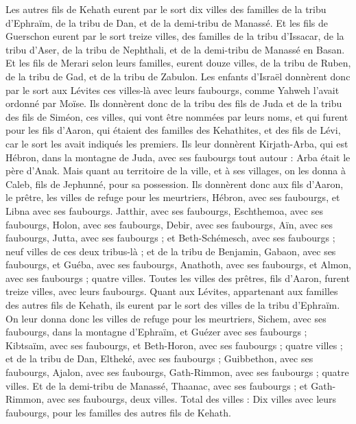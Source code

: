 \begin{multicols}{2}
Les autres fils de Kehath eurent par le sort dix villes des familles de la tribu d'Ephraïm, de la tribu de Dan, et de la demi-tribu de Manassé.
Et les fils de Guerschon eurent par le sort treize villes, des familles de la tribu d'Issacar, de la tribu d'Aser, de la tribu de Nephthali, et de la demi-tribu de Manassé en Basan.
Et les fils de Merari selon leurs familles, eurent douze villes, de la tribu de Ruben, de la tribu de Gad, et de la tribu de Zabulon.
Les enfants d'Israël donnèrent donc par le sort aux Lévites ces villes-là avec leurs faubourgs, comme Yahweh l'avait ordonné par Moïse.
Ils donnèrent donc de la tribu des fils de Juda et de la tribu des fils de Siméon, ces villes, qui vont être nommées par leurs noms,
et qui furent pour les fils d'Aaron, qui étaient des familles des Kehathites, et des fils de Lévi, car le sort les avait indiqués les premiers.
Ils leur donnèrent Kirjath-Arba, qui est Hébron, dans la montagne de Juda, avec ses faubourgs tout autour : Arba était le père d'Anak.
Mais quant au territoire de la ville, et à ses villages, on les donna à Caleb, fils de Jephunné, pour sa possession.
Ils donnèrent donc aux fils d'Aaron, le prêtre, les villes de refuge pour les meurtriers, Hébron, avec ses faubourgs, et Libna avec ses faubourgs.
Jatthir, avec ses faubourgs, Eschthemoa, avec ses faubourgs,
Holon, avec ses faubourgs, Debir, avec ses faubourgs,
Aïn, avec ses faubourgs, Jutta, avec ses faubourgs ; et Beth-Schémesch, avec ses faubourgs ; neuf villes de ces deux tribus-là ;
et de la tribu de Benjamin, Gabaon, avec ses faubourgs, et Guéba, avec ses faubourgs,
Anathoth, avec ses faubourgs, et Almon, avec ses faubourgs ; quatre villes.
Toutes les villes des prêtres, fils d'Aaron, furent treize villes, avec leurs faubourgs.
Quant aux Lévites, appartenant aux familles des autres fils de Kehath, ils eurent par le sort des villes de la tribu d'Ephraïm.
On leur donna donc les villes de refuge pour les meurtriers, Sichem, avec ses faubourgs, dans la montagne d'Ephraïm, et Guézer avec ses faubourgs ;
Kibtsaïm, avec ses faubourgs, et Beth-Horon, avec ses faubourgs ; quatre villes ;
et de la tribu de Dan, Eltheké, avec ses faubourgs ; Guibbethon, avec ses faubourgs,
Ajalon, avec ses faubourgs, Gath-Rimmon, avec ses faubourgs ; quatre villes.
Et de la demi-tribu de Manassé, Thaanac, avec ses faubourgs ; et Gath-Rimmon, avec ses faubourgs, deux villes.
Total des villes : Dix villes avec leurs faubourgs, pour les familles des autres fils de Kehath.

\end{multicols}
